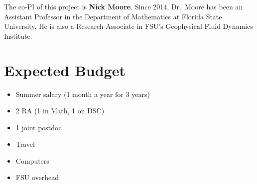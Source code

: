\documentclass[11pt]{article}
\begin{document}
The co-PI of this project is {\bf Nick Moore}.  Since 2014, Dr.~Moore
has been an Assistant Professor in the Department of Mathematics at
Florida State University.  He is also a Research Associate in FSU's
Geophysical Fluid Dynamics Institute. 


\section{Expected Budget}
\begin{itemize}
  \item Summer salary (1 month a year for 3 years)
  \item 2 RA (1 in Math, 1 on DSC)
  \item 1 joint postdoc
  \item Travel
  \item Computers
  \item FSU overhead
\end{itemize}




\footnotesize{}
\end{document}
